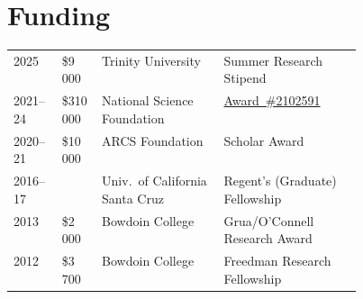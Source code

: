 \section{Funding}
\begin{tabular}{@{}p{.1\linewidth} p{0.1\linewidth} p{0.35\linewidth} @{}p{.4\linewidth}} 
    2025 & \$9\,000 & Trinity University & Summer Research Stipend\\
    2021--24 & \$310\,000 & National Science Foundation & \href{https://www.nsf.gov/awardsearch/showAward?AWD_ID=2102591}{Award~\#2102591}\\
    2020--21 & \$10\,000 & ARCS Foundation & Scholar Award \\
    2016--17 &  & Univ.~of California Santa Cruz  & Regent's (Graduate) Fellowship \\
    2013 & \$2\,000 & Bowdoin College & Grua/O'Connell Research Award  \\ 
    2012 & \$3\,700 & Bowdoin College & Freedman Research Fellowship \\
\end{tabular}